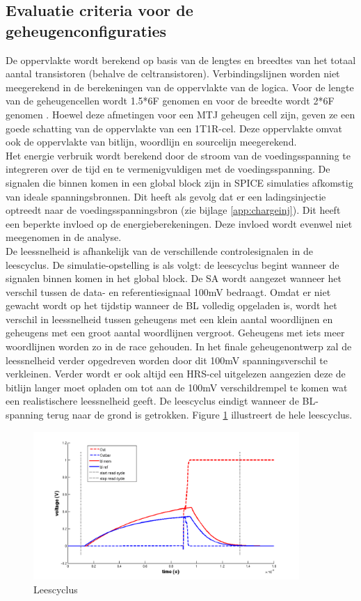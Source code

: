 \subsection{Evaluatie criteria voor de geheugenconfiguraties}
De oppervlakte wordt berekend op basis van de lengtes en breedtes van het totaal aantal transistoren (behalve de celtransistoren). Verbindingslijnen worden niet meegerekend in de berekeningen van de oppervlakte van de logica. Voor de lengte van de geheugencellen wordt 1.5*6F genomen en voor de breedte wordt 2*6F genomen \cite{ppt:cosemans}. Hoewel deze afmetingen voor een MTJ geheugen cell zijn, geven ze een goede schatting van de oppervlakte van een 1T1R-cel. Deze oppervlakte omvat ook de oppervlakte van bitlijn, woordlijn en sourcelijn meegerekend. \\
Het energie verbruik wordt berekend door de stroom van de voedingsspanning te integreren over de tijd en te vermenigvuldigen met de voedingsspanning. De signalen die binnen komen in een global block zijn in SPICE simulaties afkomstig van ideale spanningsbronnen. Dit heeft als gevolg dat er een ladingsinjectie optreedt naar de voedingsspanningsbron (zie bijlage \ref{app:chargeinj}). Dit heeft een beperkte invloed op de energieberekeningen. Deze invloed wordt evenwel niet meegenomen in de analyse. \\
De leessnelheid is afhankelijk van de verschillende controlesignalen in de leescyclus. De simulatie-opstelling is als volgt: de leescyclus begint wanneer de signalen binnen komen in het global block. De SA wordt aangezet wanneer het verschil tussen de data- en referentiesignaal 100mV bedraagt. Omdat er niet gewacht wordt op het tijdstip wanneer de BL volledig opgeladen is, wordt het verschil in leessnelheid tussen geheugens met een klein aantal woordlijnen en geheugens met een groot aantal woordlijnen vergroot. Geheugens met iets meer woordlijnen worden zo in de race gehouden. In het finale geheugenontwerp zal de leessnelheid verder opgedreven worden door dit 100mV spanningsverschil te verkleinen. Verder wordt er ook altijd een HRS-cel uitgelezen aangezien deze de bitlijn langer moet opladen om tot aan de 100mV verschildrempel te komen wat een realistischere leessnelheid geeft. De leescyclus eindigt wanneer de BL-spanning terug naar de grond is getrokken. Figure \ref{fig:leescyclus} illustreert de hele leescyclus.

\begin{figure}[!ht]
  \centering
  \includegraphics[width=0.9\textwidth]{../fig/hfdstk-timing-leescyclus.png}
  \caption[Leescyclus]{Leescyclus}
  \label{fig:leescyclus}
\end{figure} 

